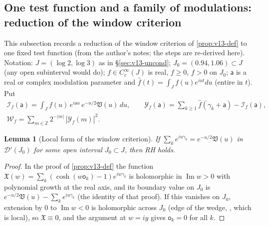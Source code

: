 \documentclass[11pt,a4paper]{article}
\numberwithin{equation}{section}
\newtheorem{lemma}[theorem]{Lemma}
\theoremstyle{definition}
\theoremstyle{remark}
\begin{document}
\subsection{One test function and a family of modulations: reduction of the window criterion}\label{sec:v15-family}
This subsection records a reduction of the window criterion of \cref{prop:v13-def} to one fixed test function (from the author's notes; the steps are re-derived here). Notation: $J=(\log2,\log3)$ as in \S\ref{sec:v13-uncond}; $J_0=(0.94,1.06)\subset J$ (any open subinterval would do); $f\in C_c^\infty(J)$ is real, $f\ge0$, $f>0$ on $J_0$; $\mathsf a$ is a real or complex modulation parameter and $\hat f(t)=\int_Jf(u)e^{iut}du$ (entire in $t$). Put
\begin{gather}
\mathscr I_f(\mathsf a)=\int_Jf(u)\,e^{i\mathsf au}\,e^{-u/2}\mathfrak V(u)\,du,\qquad
\mathscr Y_f(\mathsf a)=\sum_{k\ge1}\hat f(\gamma_k+\mathsf a)-\mathscr I_f(\mathsf a),\\
\mathscr W_f=\sum_{m\in\mathbb Z}2^{-|m|}\,|\mathscr Y_f(m)|^2 .
\end{gather}

\begin{lemma}[Local form of the window criterion]\label{lem:v15-local}
If $\sum_ke^{iu\gamma_k}=e^{-u/2}\mathfrak V(u)$ in $\mathcal D'(J_0)$ for some open interval $J_0\subset J$, then RH holds.
\end{lemma}
\begin{proof}
In the proof of \cref{prop:v13-def} the function $\mathfrak X(w)=\sum_k(\cosh(w\mathsf o_k)-1)e^{iw\gamma_k}$ is holomorphic in $\operatorname{Im}w>0$ with polynomial growth at the real axis, and its boundary value on $J_0$ is $e^{-u/2}\mathfrak V(u)-\sum_ke^{iu\gamma_k}$ (the identity of that proof). If this vanishes on $J_0$, extension by $0$ to $\operatorname{Im}w<0$ is holomorphic across $J_0$ (edge of the wedge, \cite[Lemma~5.4]{CasanaV26}, which is local), so $\mathfrak X\equiv0$, and the argument at $w=iy$ gives $\mathsf o_k=0$ for all $k$.
\end{proof}
\end{document}
